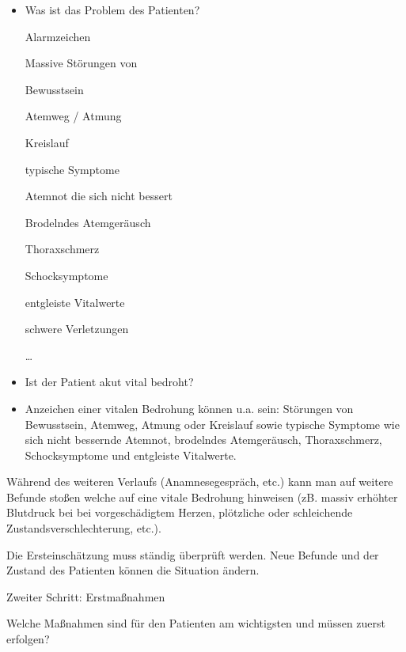 \documentclass{article}
\begin{document}
\begin{itemize}
\item Was ist das Problem des Patienten?

\begin{center}
\begin{minipage}{3.863cm}
Alarmzeichen

Massive St\"orungen von 

Bewusstsein

Atemweg / Atmung 

Kreislauf 

typische Symptome 

Atemnot die sich nicht bessert 

Brodelndes Atemger\"ausch 

Thoraxschmerz  

Schocksymptome 

entgleiste Vitalwerte

schwere Verletzungen

{\dots} 

\end{minipage}
\end{center}
\item Ist der Patient akut vital bedroht?

\end{itemize}
\begin{itemize}
\item Anzeichen einer vitalen Bedrohung k\"onnen u.a. sein: St\"orungen
von Be\-wusstsein, Atemweg, Atmung oder Kreislauf sowie typische
Symptome wie sich nicht bessernde Atemnot, brodelndes
Atem\-ge\-r\"ausch, Thoraxschmerz, Schocksymptome und entgleiste
Vital\-werte.

\end{itemize}
W\"ahrend des weiteren Verlaufs (Anamnesegespr\"ach, etc.) kann man auf
weitere Befunde sto{\ss}en welche auf eine vitale Be\-drohung hinweisen
(zB. massiv erh\"ohter Blutdruck bei bei vor\-ge\-sch\"adigtem Herzen,
pl\"otzliche oder schleichende Zustands\-verschlechterung, etc.). 

Die Ersteinsch\"atzung muss st\"andig \"uberpr\"uft werden. Neue Befunde
und der Zustand des Patienten k\"onnen die Situation \"andern.

Zweiter Schritt: Erstma{\ss}nahmen

Welche Ma{\ss}nahmen sind f\"ur den Patienten am wichtigsten und
m\"ussen zuerst erfolgen? 
\end{document}
